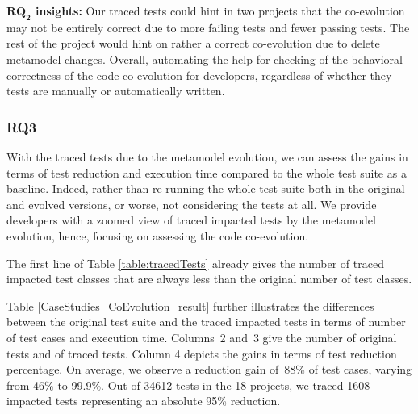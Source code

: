 \begin{table}[t]
{\begin{tabular}{
			@{\hskip3pt}c@{\hskip3pt}|c@{\hskip3pt}|c@{\hskip3pt}|c@{\hskip3pt}|c@{\hskip3pt}|c@{\hskip3pt}|c@{\hskip3pt}|c@{\hskip3pt}|| c@{\hskip3pt} |c@{\hskip3pt} }
		
		\bottomrule
	\end{tabular}
}
\end{table}

\begin{tcolorbox}[boxsep=-2pt]
\textbf{$\boldsymbol{RQ_2}$ insights:}
Our traced tests could hint in two projects that the co-evolution may not be entirely correct due to more failing tests and fewer passing tests. The rest of the project would hint on rather a correct co-evolution due to delete metamodel changes. Overall, automating the help for checking of the behavioral correctness of the code co-evolution for developers, regardless of whether they tests are manually or automatically written.  
\end{tcolorbox}



\subsubsection{RQ3}
With the traced tests due to the metamodel evolution, we can assess the gains in terms of test reduction and execution time compared to the whole test suite as a baseline. 
Indeed, rather than re-running the whole test suite both in the original and evolved versions, or worse, not considering the tests at all. We provide developers with a zoomed view of traced impacted tests by the metamodel evolution, hence, focusing on assessing the code co-evolution.  

The first line of Table \ref{table:tracedTests} already gives the number of traced impacted test classes that are always less than the original number of test classes. 

Table \ref{CaseStudies_CoEvolution_result} further illustrates the differences between the original test suite and the traced impacted tests in terms of number of test cases and execution time. Columns~2 and~3 give the number of original tests and of traced tests.
%
Column 4 depicts the gains in terms of test reduction percentage. On average, we observe a reduction gain of~88\% of test cases, varying from 46\% to 99.9\%. Out of 34612 tests in the 18 projects, we traced 1608 impacted tests representing an absolute 95\% reduction.

